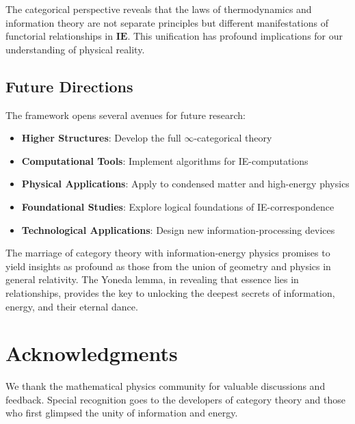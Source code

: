\documentclass[12pt]{article}
\begin{document}
The categorical perspective reveals that the laws of thermodynamics and information theory are not separate principles but different manifestations of functorial relationships in $\mathbf{IE}$. This unification has profound implications for our understanding of physical reality.

\subsection{Future Directions}

The framework opens several avenues for future research:

\begin{itemize}
\item \textbf{Higher Structures}: Develop the full $\infty$-categorical theory
\item \textbf{Computational Tools}: Implement algorithms for IE-computations
\item \textbf{Physical Applications}: Apply to condensed matter and high-energy physics
\item \textbf{Foundational Studies}: Explore logical foundations of IE-correspondence
\item \textbf{Technological Applications}: Design new information-processing devices
\end{itemize}

The marriage of category theory with information-energy physics promises to yield insights as profound as those from the union of geometry and physics in general relativity. The Yoneda lemma, in revealing that essence lies in relationships, provides the key to unlocking the deepest secrets of information, energy, and their eternal dance.

\section*{Acknowledgments}

We thank the mathematical physics community for valuable discussions and feedback. Special recognition goes to the developers of category theory and those who first glimpsed the unity of information and energy.
\end{document}
